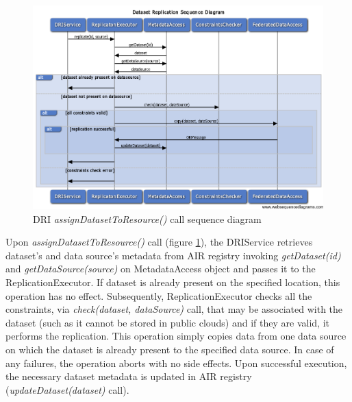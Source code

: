 \begin{figure}[h!]
	\centering
	\includegraphics[width=\textwidth]{images/replication-diagram.png}
	\caption{DRI \textit{assignDatasetToResource()} call sequence diagram}
	\label{fig:replication-diagram}
\end{figure}

Upon \textit{assignDatasetToResource()} 
call (figure \ref{fig:replication-diagram}), the DRIService retrieves
dataset's and data source's metadata from AIR registry invoking
\textit{getDataset(id)} and \textit{getDataSource(source)} on MetadataAccess object and
passes it to the ReplicationExecutor. If dataset is already present on the
specified location, this operation has no effect. Subsequently,
ReplicationExecutor checks all the constraints, via 
\textit{check(dataset, dataSource)} call, that may be associated with the
dataset (such as it cannot be stored in public clouds) and if they are valid,
it performs the replication. This operation simply copies data from one data
source on which the dataset is already present to the specified data source.
In case of any failures, the operation aborts with no side effects. Upon
successful execution, the necessary dataset metadata is updated in AIR registry
(\textit{updateDataset(dataset)} call).\\

